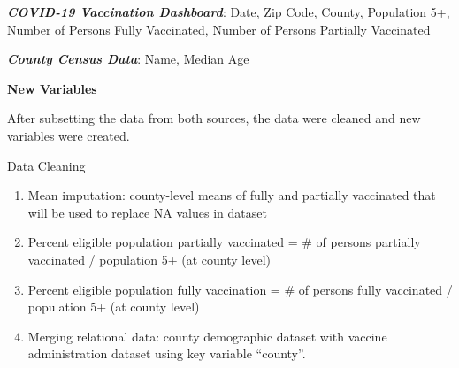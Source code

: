 \documentclass[
  ignorenonframetext,
]{beamer}
\providecommand{\tightlist}{%
  \setlength{\itemsep}{0pt}\setlength{\parskip}{0pt}}
\begin{document}
\begin{frame}
\textbf{\emph{COVID-19 Vaccination Dashboard}}: Date, Zip Code, County,
Population 5+, Number of Persons Fully Vaccinated, Number of Persons
Partially Vaccinated

\textbf{\emph{County Census Data}}: Name, Median Age



\textbf{New Variables}

After subsetting the data from both sources, the data were cleaned and
new variables were created.

Data Cleaning

\begin{enumerate}
\tightlist
\item
  Mean imputation: county-level means of fully and partially vaccinated
  that will be used to replace NA values in dataset
\item
  Percent eligible population partially vaccinated = \# of persons
  partially vaccinated / population 5+ (at county level)
\item
  Percent eligible population fully vaccination = \# of persons fully
  vaccinated / population 5+ (at county level)
\item
  Merging relational data: county demographic dataset with vaccine
  administration dataset using key variable ``county''.
\end{enumerate}


\end{frame}
\end{document}
